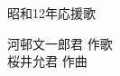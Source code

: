 \documentclass[10pt,b5j]{tarticle} %
\begin{document}
\begin{minipage}[c]{0.7\hsize} %
    \begin{center}
        {\LARGE
            昭和12年応援歌 %
        }
        {\small 
        }
    \end{center}
\end{minipage}
\begin{minipage}[c]{0.3\hsize} %
    \begin{flushright} %
        河邨文一郎君 作歌\\桜井允君 作曲 %
    \end{flushright}
\end{minipage}
\end{document}
